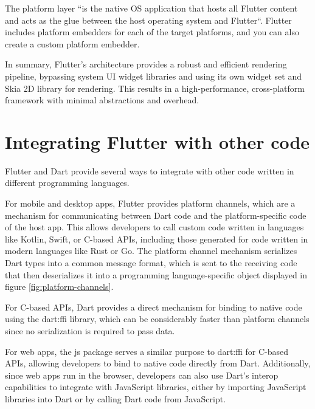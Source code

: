 \documentclass[conference]{IEEEtran}
\begin{document}
The platform layer ``is the native OS application that hosts all Flutter content and acts as the glue between the host operating system and Flutter``\cite{b1.1}. Flutter includes platform embedders for each of the target platforms, and you can also create a custom platform embedder.

In summary, Flutter's architecture provides a robust and efficient rendering pipeline, bypassing system UI widget libraries and using its own widget set and Skia 2D library \cite{b1.2} for rendering. This results in a high-performance, cross-platform framework with minimal abstractions and overhead.

\section{Integrating Flutter with other code}

Flutter and Dart provide several ways to integrate with other code written in different programming languages.

For mobile and desktop apps, Flutter provides platform channels, which are a mechanism for communicating between Dart code and the platform-specific code of the host app. This allows developers to call custom code written in languages like Kotlin, Swift, or C-based APIs, including those generated for code written in modern languages like Rust or Go. The platform channel mechanism serializes Dart types into a common message format, which is sent to the receiving code that then deserializes it into a programming language-specific object displayed in figure \ref{fig:platform-channels}. 

For C-based APIs, Dart provides a direct mechanism for binding to native code using the dart:ffi library, which can be considerably faster than platform channels since no serialization is required to pass data.

For web apps, the js package serves a similar purpose to dart:ffi for C-based APIs, allowing developers to bind to native code directly from Dart. Additionally, since web apps run in the browser, developers can also use Dart's interop capabilities to integrate with JavaScript libraries, either by importing JavaScript libraries into Dart or by calling Dart code from JavaScript.
\end{document}
